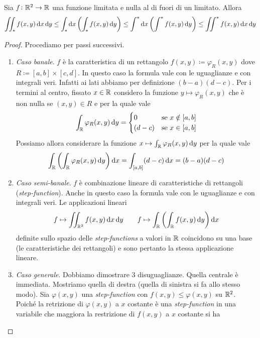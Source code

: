 \begin{thm}
	Sia $ f \colon \mathbb{R}^2 \to \mathbb{R} $ una funzione limitata e nulla al di fuori di un limitato. Allora 
	\begin{equation} \label{eqn:fubinitonelli}
		\iint_{*} f(x, y) \dif{x} \dif{y} \leq \int_{*} \dif{x}\left(\int_{*} f(x, y) \dif{y}\right) \leq \int^{*} \dif{x}\left(\int^{*} f(x, y) \dif{y}\right) \leq \iint^{*} f(x, y) \dif{x} \dif{y}
	\end{equation}
\end{thm}
%
\begin{proof}
	Procediamo per passi successivi. 
	\begin{enumerate}
		\item \emph{Caso banale}. $ f $ è la caratteristica di un rettangolo $ f(x, y) \coloneqq \varphi_{R}(x, y) $ dove $ R \coloneqq [a, b] \times [c, d] $. In questo caso la formula vale con le uguaglianze e con integrali veri. Infatti ai lati abbiamo per definizione  $ (b - a)(d - c) $. Per i termini al centro, fissato $ x \in \mathbb{R} $ considero la funzione $ y \mapsto \varphi_{R}(x, y) $ che è non nulla se $ (x, y) \in R $ e per la quale vale 
		\[
			\int_{\R} \varphi_{R}(x, y) \dif{y} =
			\begin{cases}
				0 & \text{se $ x \notin [a, b] $} \\
				(d - c) & \text{se $ x \in [a, b] $} 
			\end{cases}
		\]
		Possiamo allora considerare la funzione $ x \mapsto \int_{\R} \varphi_{R}(x, y) \dif{y} $ per la quale vale
		\[
			\int_{\R} \left(\int_{\R} \varphi_{R}(x, y) \dif{y}\right) \dif{x} = \int_{[a, b]} (d - c) \dif{x} = (b - a)(d - c)
		\]
		\item \emph{Caso semi-banale}. $ f $ è combinazione lineare di caratteristiche di rettangoli (\emph{step-function}). Anche in questo caso la formula vale con le uguaglianze e con integrali veri. Le applicazioni lineari 
		\[
			f \mapsto \iint_{\R^2} f(x, y) \dif{x} \dif{y} \qquad f \mapsto \int_{\R} \left(\int_{\R} f(x, y) \dif{y}\right) \dif{x}
		\]
		definite sullo spazio delle \emph{step-functions} a valori in $ \mathbb{R} $ coincidono su una base (le caratteristiche dei rettangoli) e sono pertanto la stessa applicazione lineare. 
		\item \emph{Caso generale}. Dobbiamo dimostrare 3 disuguaglianze. Quella centrale è immediata. Mostriamo quella di destra (quella di sinistra si fa allo stesso modo). Sia $ \varphi(x, y) $ una \emph{step-function} con $ f(x, y) \leq \varphi(x, y) $ su $ \mathbb{R}^2 $. Poiché la retrizione di $ \varphi(x, y) $ a $ x $ costante è una \emph{step-function} in una variabile che maggiora la restrizione di $ f(x, y) $ a $ x $ costante si ha

\end{enumerate}
\end{proof}
